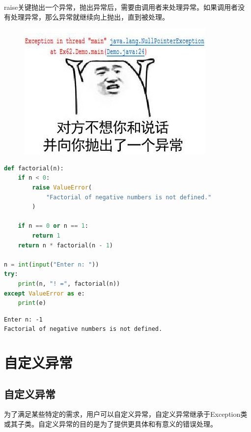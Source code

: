 raise关键抛出一个异常，抛出异常后，需要由调用者来处理异常。如果调用者没有处理异常，那么异常就继续向上抛出，直到被处理。\\

\begin{figure}[H]
    \centering
    \includegraphics{img/Chapter9/9-1/2.png}
\end{figure}


\begin{lstlisting}[language=Python]
def factorial(n):
    if n < 0:
        raise ValueError(
            "Factorial of negative numbers is not defined."
        )
    
    if n == 0 or n == 1:
        return 1
    return n * factorial(n - 1)

n = int(input("Enter n: "))
try:
    print(n, "! =", factorial(n))
except ValueError as e:
    print(e)
\end{lstlisting}

\begin{tcolorbox}
    \begin{verbatim}
Enter n: -1
Factorial of negative numbers is not defined.
	\end{verbatim}
\end{tcolorbox}

\newpage

\section{自定义异常}

\subsection{自定义异常}

为了满足某些特定的需求，用户可以自定义异常，自定义异常继承于Exception类或其子类。自定义异常的目的是为了提供更具体和有意义的错误处理。\\

